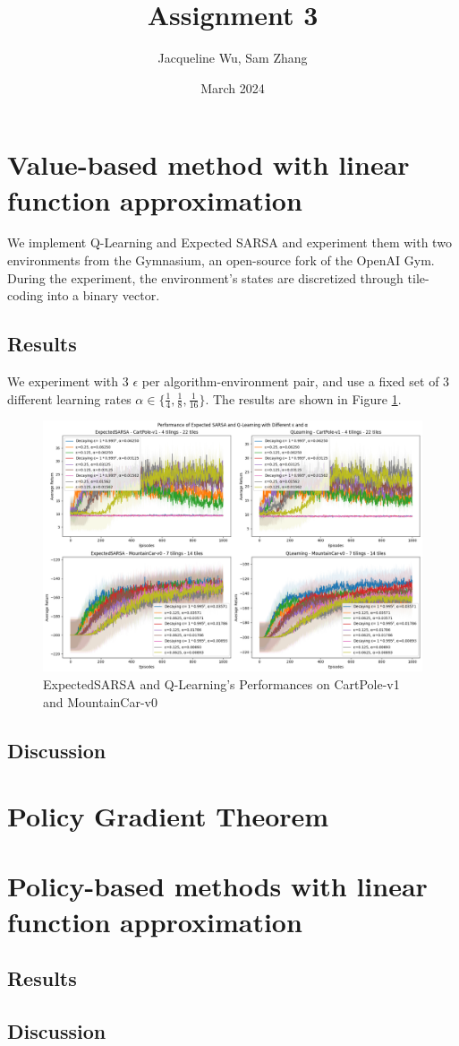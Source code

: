 \documentclass{article}
\title{Assignment 3}
\author{Jacqueline Wu, Sam Zhang}
\date{March 2024}
\begin{document}
\maketitle

\section{Value-based method with linear function approximation}
We implement Q-Learning and Expected SARSA and experiment them with two environments from the Gymnasium, an open-source fork of the OpenAI Gym. \cite{gymnasium}
During the experiment, the environment's states are discretized through tile-coding into a binary vector.

\subsection{Results}
We experiment with 3 $\epsilon$ per algorithm-environment pair, and use a fixed set of 3 different learning rates $\alpha \in \{ \frac{1}{4}, \frac{1}{8}, \frac{1}{16} \}$. The results are shown in Figure \ref{fig:q1}.

\begin{figure}[htbp]
    \centering
    \includegraphics[scale=0.33]{q1.png}
    \caption{ExpectedSARSA and Q-Learning's Performances on CartPole-v1 and MountainCar-v0}
    \label{fig:q1}
\end{figure}

\subsection{Discussion}


\section{Policy Gradient Theorem}

\section{Policy-based methods with linear function approximation}

\subsection{Results}

\subsection{Discussion}

\newpage
{}

\end{document}
